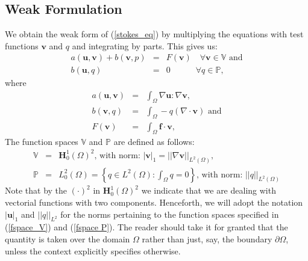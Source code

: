 \documentclass[12pt,a4paper]{article}
\theoremstyle{definition}
\begin{document}
\subsection{Weak Formulation}\label{weak-form-stokes}
We obtain the weak form of (\ref{stokes_eq}) by multiplying the equations with test functions $\textbf{v}$ and $q$ and integrating by parts.  This gives us:
\begin{eqnarray}\label{form-a}
	a\left(\textbf{u},\textbf{v}\right) + b\left(\textbf{v},p\right) &=& F\left(\textbf{v}\right)\quad \forall 
\textbf{v} \in \mathbb{V} \text{ and} \\\label{form-b}
	b\left(\textbf{u},q\right)&=&0 \quad \quad\quad\forall q \in \mathbb{P},
\end{eqnarray}
where 
\begin{eqnarray}\label{weak-a}
	a\left(\textbf{u},\textbf{v}\right)&=&\int_{\Omega}\nabla \textbf{u} : \nabla \textbf{v}, \\\label{weak-b}
	b\left(\textbf{v},q\right) &=& \int_{\Omega}-q\left(\nabla \cdot \textbf{v}\right) \text{ and}\\\label{weak-F}
    F\left(\textbf{v}\right) &=& \int_{\Omega}\textbf{f}\cdot \textbf{v} ,
\end{eqnarray}
The function spaces $\mathbb{V}$ and $\mathbb{P}$ are defined as follows:
\begin{eqnarray}\label{fspace_V}
\mathbb{V}&=&\textbf{H}^1_0\left(\Omega\right)^2\text{, with norm: } \left|\textbf{v}\right|_{1}=\left|\left|\nabla\textbf{v}\right|\right|_{L^2\left(\Omega\right)}, \\\label{fspace P}
\mathbb{P}&=&L^2_0\left(\Omega\right)=\left\lbrace q\in L^2\left(\Omega\right): \int_\Omega q=0\right\rbrace\text{, with norm: } \left|\left|q\right|\right|_{L^2\left(\Omega\right)}
\end{eqnarray}
Note that by the $(\cdot)^2$ in $\textbf{H}^{1}_{0}\left(\Omega\right)^2$ we indicate that we are dealing with vectorial functions with two components. Henceforth, we will adopt the notation $\left|\textbf{u}\right|_1$ and $\left|\left|q\right|\right|_{L^2}$ for the norms pertaining to the function spaces specified in (\ref{fspace_V}) and (\ref{fspace P}).  The reader should take it for granted that the quantity is taken over the domain $\Omega$ rather than just, say, the boundary $\partial \Omega$, unless the context explicitly specifies otherwise.
\end{document}
